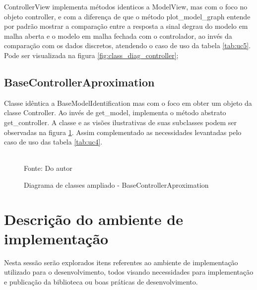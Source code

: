 ControllerView implementa métodos identicos a ModelView, mas com o foco no objeto controller, e com a diferença de que
o método plot\_model\_graph entende por padrão mostrar a comparação entre a resposta a sinal degrau do modelo em malha
aberta e o modelo em malha fechada com o controlador, ao invés da comparação com os dados discretos, atendendo o caso de
uso da tabela \ref{tab:uc5}.
Pode ser visualizada na figura \ref{fig:class_diag_controller};

\subsection{BaseControllerAproximation}

Classe idêntica a BaseModelIdentification mas com o foco em obter um objeto da classe Controller.
Ao invés de get\_model, implementa o método abstrato get\_controller.
A classe e as visões ilustrativas de suas subclasses podem ser observadas na figura \ref{fig:class_diag_bcacontroller}.
Assim complementado as necessidades levantadas pelo caso de uso das tabela \ref{tab:uc4}.

\begin{figure}[H]
    \centering
    \caption{Diagrama de classes ampliado - BaseControllerAproximation}
    \label{fig:class_diag_bcacontroller}
    \\
    \vspace{0cm}\hspace{0cm}\small{Fonte: Do autor}
\end{figure}


\section{Descrição do ambiente de implementação}

Nesta sessão serão explorados itens referentes ao ambiente de implementação utilizado para o
desenvolvimento, todos visando necessidades para implementação e publicação da biblioteca ou boas práticas de
desenvolvimento.

